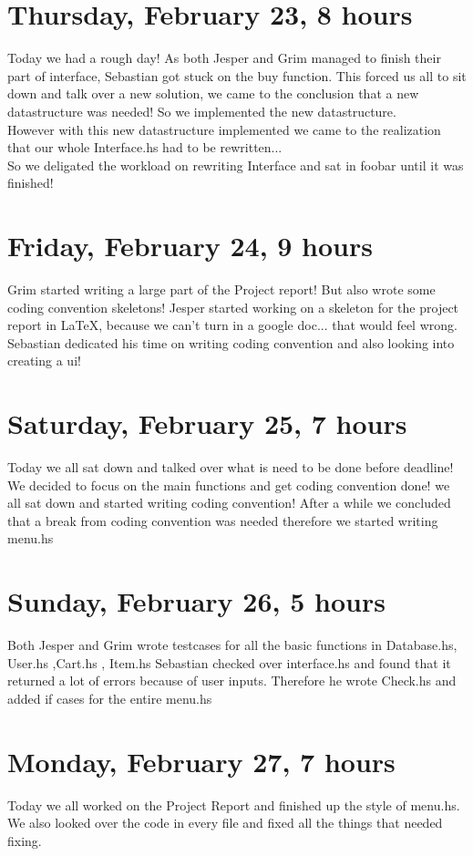 \documentclass[11pt]{article}
\begin{document}
\section*{Thursday, February 23, 8 hours}
Today we had a rough day! As both Jesper and Grim managed to finish their part of interface, Sebastian got stuck on the buy function.
This forced us all to sit down and talk over a new solution, we came to the conclusion that a new datastructure was needed! So we implemented the new datastructure. \\
However with this new datastructure implemented we came to the realization that our whole Interface.hs had to be rewritten...\\
So we deligated the workload on rewriting Interface and sat in foobar until it was finished!
\section*{Friday, February 24, 9 hours}
Grim started writing a large part of the Project report! But also wrote some coding convention skeletons!
Jesper started working on a skeleton for the project report in LaTeX, because we can't turn in a google doc... that would feel wrong.
Sebastian dedicated his time on writing coding convention and also looking into creating a ui!
\section*{Saturday, February 25, 7 hours}
Today we all sat down and talked over what is need to be done before deadline!
We decided to focus on the main functions and get coding convention done! we all sat down and started writing coding convention!
After a while we concluded that a break from coding convention was needed therefore we started writing menu.hs
\section*{Sunday, February 26, 5 hours}
Both Jesper and Grim wrote testcases for all the basic functions in Database.hs, User.hs ,Cart.hs , Item.hs
Sebastian checked over interface.hs and found that it returned a lot of errors because of user inputs. Therefore he wrote Check.hs and added if cases for the entire menu.hs
\section*{Monday, February 27, 7 hours}
Today we all worked on the Project Report and finished up the style of menu.hs. We also looked over the code in every file and fixed all the things that needed fixing.
\end{document}
